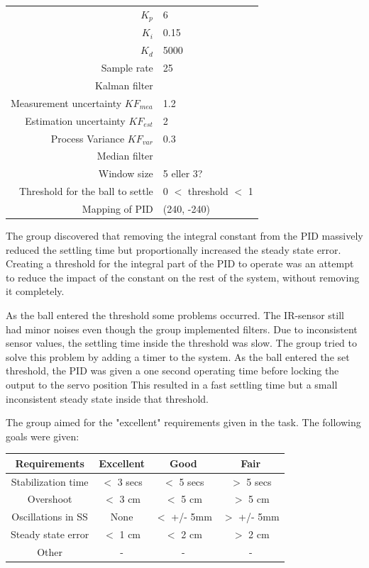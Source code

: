 \begin{tabular}{r l}
   $K_p$ & 6\\
    $K_i$ & 0.15\\
    $K_d$ & 5000\\
    Sample rate & 25\\
Kalman filter \\
    Measurement uncertainty $KF_{mea}$ & 1.2 \\
    Estimation uncertainty $KF_{est}$ & 2 \\
    Process Variance $KF_{var}$ & 0.3 \\
Median filter\\
    Window size & 5 eller 3?\\
Threshold for the ball to settle & 0 $<$ threshold $<$ 1\\
Mapping of PID & (240, -240)\\
\end{tabular}

The group discovered that removing the integral constant from the PID massively reduced the settling time but proportionally increased the steady state error. Creating a threshold for the integral part of the PID to operate was an attempt to reduce the impact of the constant on the rest of the system, without removing it completely. 

As the ball entered the threshold some problems occurred. The IR-sensor still had minor noises even though the group implemented filters. Due to inconsistent sensor values, the settling time inside the threshold was slow. The group tried to solve this problem by adding a timer to the system. As the ball entered the set threshold, the PID was given a one second operating time before locking the output to the servo position This resulted in a fast settling time but a small inconsistent steady state inside that threshold.

The group aimed for the "excellent" requirements given in the task. The following goals were given:
\begin{center}
\begin{tabular}{ |c|c|c|c|}
 \hline
 Requirements & Excellent & Good & Fair \\
 \hline
 Stabilization time & $<$ 3 secs & $<$ 5 secs & $>$ 5 secs\\ 
 \hline
 Overshoot & $<$ 3 cm & $<$ 5 cm & $>$ 5 cm \\  
 \hline
 Oscillations in SS & None & $<$ +/- 5mm & $>$ +/- 5mm \\
 \hline
 Steady state error & $<$ 1 cm & $<$ 2 cm & $>$ 2 cm \\
 \hline
 Other & - & - & - \\
 \hline
\end{tabular}
\end{center}

